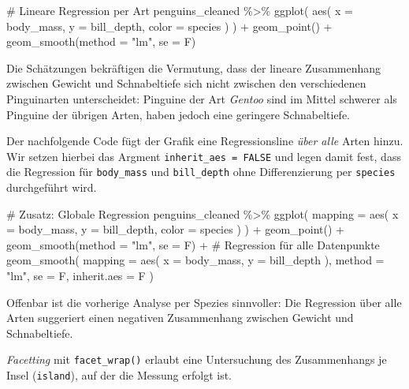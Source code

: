 \documentclass[
  a4paper,
  DIV=11,
  oneside]{scrreprt}
\newenvironment{Shaded}{\begin{snugshade}}{\end{snugshade}}
\newcommand{\NormalTok}[1]{\textcolor[rgb]{0.00,0.23,0.31}{#1}}
\begin{document}
\begin{Shaded}
\begin{Highlighting}[]
\NormalTok{\# Lineare Regression per Art}
\NormalTok{penguins\_cleaned \%\textgreater{}\%}
\NormalTok{  ggplot(}
\NormalTok{    aes(}
\NormalTok{      x = body\_mass, }
\NormalTok{      y = bill\_depth, }
\NormalTok{      color = species}
\NormalTok{    )}
\NormalTok{  ) +}
\NormalTok{  geom\_point() +}
\NormalTok{  geom\_smooth(method = "lm", se = F)}
\end{Highlighting}
\end{Shaded}

Die Schätzungen bekräftigen die Vermutung, dass der lineare Zusammenhang
zwischen Gewicht und Schnabeltiefe sich nicht zwischen den verschiedenen
Pinguinarten unterscheidet: Pinguine der Art \emph{Gentoo} sind im
Mittel schwerer als Pinguine der übrigen Arten, haben jedoch eine
geringere Schnabeltiefe.

Der nachfolgende Code fügt der Grafik eine Regressionsline \emph{über
alle} Arten hinzu. Wir setzen hierbei das Argment
\texttt{inherit\_aes\ =\ FALSE} und legen damit fest, dass die
Regression für \texttt{body\_mass} und \texttt{bill\_depth} ohne
Differenzierung per \texttt{species} durchgeführt wird.

\begin{Shaded}
\begin{Highlighting}[]
\NormalTok{\# Zusatz: Globale Regression}
\NormalTok{penguins\_cleaned \%\textgreater{}\%}
\NormalTok{  ggplot(}
\NormalTok{    mapping = aes(}
\NormalTok{      x = body\_mass, }
\NormalTok{      y = bill\_depth, }
\NormalTok{      color = species}
\NormalTok{    )}
\NormalTok{  ) +}
\NormalTok{  geom\_point() +}
\NormalTok{  geom\_smooth(method = "lm", se = F) +}
\NormalTok{  \# Regression für alle Datenpunkte}
\NormalTok{  geom\_smooth(}
\NormalTok{    mapping = aes(}
\NormalTok{      x = body\_mass, }
\NormalTok{      y = bill\_depth}
\NormalTok{    ),}
\NormalTok{    method = "lm", }
\NormalTok{    se = F, }
\NormalTok{    inherit.aes = F}
\NormalTok{  )}
\end{Highlighting}
\end{Shaded}

Offenbar ist die vorherige Analyse per Spezies sinnvoller: Die
Regression über alle Arten suggeriert einen negativen Zusammenhang
zwischen Gewicht und Schnabeltiefe.

\emph{Facetting} mit \texttt{facet\_wrap()} erlaubt eine Untersuchung
des Zusammenhangs je Insel (\texttt{island}), auf der die Messung
erfolgt ist.
\end{document}
